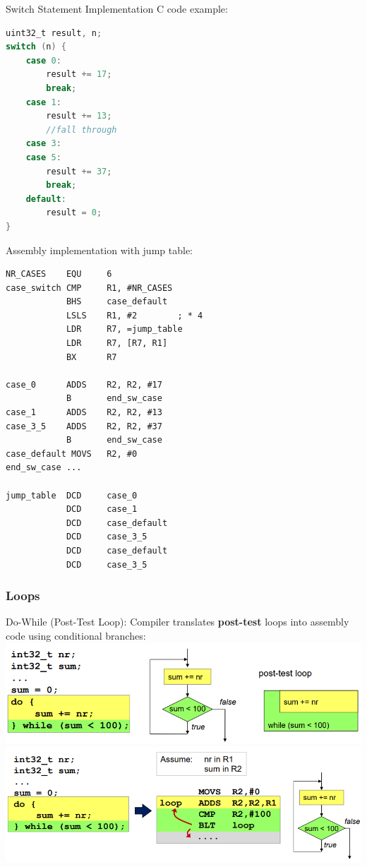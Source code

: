 \begin{example2}{Switch Statement Implementation}
C code example:
\begin{lstlisting}[language=C, style=basesmol]
uint32_t result, n;
switch (n) {
    case 0:
        result += 17;
        break;
    case 1:
        result += 13;
        //fall through
    case 3: 
    case 5:
        result += 37;
        break;
    default:
        result = 0;
}
\end{lstlisting}

Assembly implementation with jump table:
\begin{lstlisting}[language=armasm, style=basesmol]
NR_CASES    EQU     6
case_switch CMP     R1, #NR_CASES
            BHS     case_default
            LSLS    R1, #2        ; * 4
            LDR     R7, =jump_table
            LDR     R7, [R7, R1]
            BX      R7

case_0      ADDS    R2, R2, #17
            B       end_sw_case
case_1      ADDS    R2, R2, #13
case_3_5    ADDS    R2, R2, #37
            B       end_sw_case
case_default MOVS   R2, #0
end_sw_case ...

jump_table  DCD     case_0
            DCD     case_1
            DCD     case_default
            DCD     case_3_5
            DCD     case_default
            DCD     case_3_5
\end{lstlisting}
\end{example2}

\pagebreak

\subsubsection{Loops}

\begin{concept}{Do-While (Post-Test Loop)}:
Compiler translates \textbf{post-test} loops into assembly code using conditional branches:\\
\includegraphics[width=\linewidth]{images/dowhile.png}\\
\includegraphics[width=\linewidth]{images/dowhile2.png}
\end{concept}

